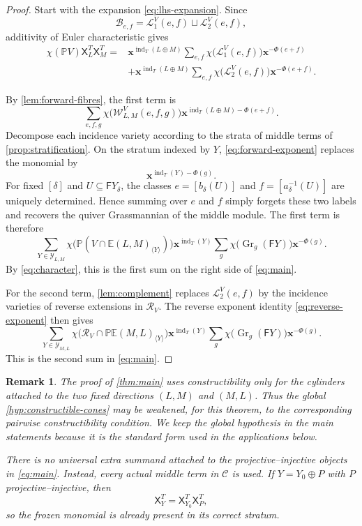 \documentclass[11pt,reqno]{article}
\numberwithin{equation}{section}
\newtheorem{remark}[remark]{Remark}
\theoremstyle{definition}
\DeclareMathOperator{\Gr}{Gr}
\DeclareMathOperator{\ind}{ind}
\newcommand{\C}{\mathcal C}
\newcommand{\E}{\mathbb E}
\newcommand{\F}{\mathsf F}
\newcommand{\X}{\mathsf X}
\newcommand{\bx}{\mathbf x}
\begin{document}
\begin{proof}
Start with the expansion \eqref{eq:lhs-expansion}.  Since
\[
 \mathcal B_{e,f}=\mathcal L^V_1(e,f)\sqcup\mathcal L^V_2(e,f),
\]
additivity of Euler characteristic gives
\begin{align*}
 \chi(\mathbb PV)\X^T_L\X^T_M
 ={}&\bx^{\ind_T(L\oplus M)}
 \sum_{e,f}\chi\bigl(\mathcal L^V_1(e,f)\bigr)\bx^{-\Phi(e+f)}\\
 &+\bx^{\ind_T(L\oplus M)}
 \sum_{e,f}\chi\bigl(\mathcal L^V_2(e,f)\bigr)\bx^{-\Phi(e+f)}.
\end{align*}

By \cref{lem:forward-fibres}, the first term is
\[
 \sum_{e,f,g}\chi\bigl(\mathcal W^V_{L,M}(e,f,g)\bigr)
 \bx^{\ind_T(L\oplus M)-\Phi(e+f)}.
\]
Decompose each incidence variety according to the strata of middle terms of \cref{prop:stratification}.  On the stratum indexed by $Y$, \eqref{eq:forward-exponent} replaces the monomial by
\[
 \bx^{\ind_T(Y)-\Phi(g)}.
\]
For fixed $[\delta]$ and $U\subseteq\F Y_\delta$, the classes $e=[b_\delta(U)]$ and $f=[a_\delta^{-1}(U)]$ are uniquely determined.  Hence summing over $e$ and $f$ simply forgets these two labels and recovers the quiver Grassmannian of the middle module.  The first term is therefore
\[
 \sum_{Y\in\mathcal Y_{L,M}}
 \chi\bigl(\mathbb P(V\cap\E(L,M)_{\langle Y\rangle})\bigr)
 \bx^{\ind_T(Y)}
 \sum_g\chi\bigl(\Gr_g(\F Y)\bigr)\bx^{-\Phi(g)}.
\]
By \eqref{eq:character}, this is the first sum on the right side of \eqref{eq:main}.

For the second term, \cref{lem:complement} replaces
$\mathcal L^V_2(e,f)$ by the incidence varieties of reverse extensions in $\mathcal R_V$.  The reverse exponent identity \eqref{eq:reverse-exponent} then gives
\[
 \sum_{Y\in\mathcal Y_{M,L}}
 \chi\bigl(\mathcal R_V\cap
   \mathbb P\E(M,L)_{\langle Y\rangle}\bigr)
 \bx^{\ind_T(Y)}
 \sum_g\chi\bigl(\Gr_g(\F Y)\bigr)\bx^{-\Phi(g)}.
\]
This is the second sum in \eqref{eq:main}.
\end{proof}

\begin{remark}\label{rem:no-extra-term}
The proof of \cref{thm:main} uses constructibility only for the cylinders attached to the two fixed directions $(L,M)$ and $(M,L)$.  Thus the global \cref{hyp:constructible-cones} may be weakened, for this theorem, to the corresponding pairwise constructibility condition.  We keep the global hypothesis in the main statements because it is the standard form used in the applications below.

There is no universal extra summand attached to the projective--injective objects in \eqref{eq:main}.  Instead, every actual middle term in $\C$ is used.  If
$Y=Y_0\oplus P$ with $P$ projective--injective, then
\[
 \X^T_Y=\X^T_{Y_0}\X^T_P,
\]
so the frozen monomial is already present in its correct stratum.
\end{remark}
\end{document}
